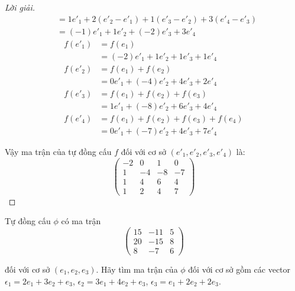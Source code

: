 \begin{proof}[Lời giải]
\begin{align*}
                 & = 1e'_{1} + 2(e'_{2} - e'_{1}) + 1(e'_{3} - e'_{2}) + 3(e'_{4} - e'_{3})    \\
                 & = (-1)e'_{1} + 1e'_{2} + (-2)e'_{3} + 3e'_{4}
    \end{align*}
    \begin{align*}
        f(e'_{1}) & = f(e_{1})                                  \\
                  & = (-2)e'_{1} + 1e'_{2} + 1e'_{3} + 1e'_{4}  \\
        f(e'_{2}) & = f(e_{1}) + f(e_{2})                       \\
                  & = 0e'_{1} + (-4)e'_{2} + 4e'_{3} + 2e'_{4}  \\
        f(e'_{3}) & = f(e_{1}) + f(e_{2}) + f(e_{3})            \\
                  & = 1e'_{1} + (-8)e'_{2} + 6e'_{3} + 4e'_{4}  \\
        f(e'_{4}) & = f(e_{1}) + f(e_{2}) + f(e_{3}) + f(e_{4}) \\
                  & = 0e'_{1} + (-7)e'_{2} + 4e'_{3} + 7e'_{4}
    \end{align*}
    
    Vậy ma trận của tự đồng cấu $f$ đối với cơ sở $(e'_{1}, e'_{2}, e'_{3}, e'_{4})$ là:
    \[
        \begin{pmatrix}
            -2 & 0  & 1  & 0  \\
            1  & -4 & -8 & -7 \\
            1  & 4  & 6  & 4  \\
            1  & 2  & 4  & 7
        \end{pmatrix}
    \]
\end{proof}

\begin{exercise}
    Tự đồng cấu $\phi$ có ma trận
    \[
        \begin{pmatrix}
            15 & -11 & 5 \\
            20 & -15 & 8 \\
            8  & -7  & 6
        \end{pmatrix}
    \]
    
    đối với cơ sở $(e_{1}, e_{2}, e_{3})$. Hãy tìm ma trận của $\phi$ đối với cơ sở gồm các vector $\epsilon_{1} = 2e_{1} + 3e_{2} + e_{3}$, $\epsilon_{2} = 3e_{1} + 4e_{2} + e_{3}$, $\epsilon_{3} = e_{1} + 2e_{2} + 2e_{3}$.
\end{exercise}

